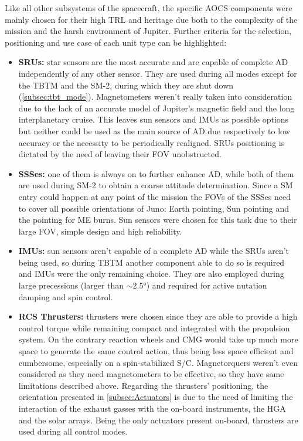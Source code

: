Like all other subsystems of the spacecraft, the specific AOCS components were mainly chosen for their high TRL and heritage due both to the complexity of the mission and the harsh environment of Jupiter. Further criteria for the selection, positioning and use case of each unit type can be highlighted:
\begin{itemize}
    \item \textbf{SRUs:} star sensors are the most accurate and are capable of complete AD independently of any other sensor. They are used during all modes except for the TBTM and the SM-2, during which they are shut down (\autoref{subsec:tbt_mode}). Magnetometers weren't really taken into consideration due to the lack of an accurate model of Jupiter's magnetic field and the long interplanetary cruise. This leaves sun sensors and IMUs as possible options but neither could be used as the main source of AD due respectively to low accuracy or the necessity to be periodically realigned. SRUs positioning is dictated by the need of leaving their FOV unobstructed.
    \item \textbf{SSSes:} one of them is always on to further enhance AD, while both of them are used during SM-2 to obtain a coarse attitude determination. Since a SM entry could happen at any point of the mission the FOVs of the SSSes need to cover all possible orientations of Juno: Earth pointing, Sun pointing and the pointing for ME burns. Sun sensors were chosen for this task due to their large FOV, simple design and high reliability.
    \item \textbf{IMUs:} sun sensors aren't capable of a complete AD while the SRUs aren't being used, so during TBTM another component able to do so is required and IMUs were the only remaining choice. They are also employed during large precessions (larger than $\sim$2.5°) and required for active nutation damping and spin control. \cite{juno_sito}
    \item \textbf{RCS Thrusters:} thrusters were chosen since they are able to provide a high control torque while remaining compact and integrated with the propulsion system. On the contrary reaction wheels and CMG would take up much more space to generate the same control action, thus being less space efficient and cumbersome, especially on a spin-stabilized S/C. Magnetorquers weren't even considered as they need magnetometers to be effective, so they have same limitations described above. Regarding the thrusters' positioning, the orientation presented in \autoref{subsec:Actuators} is due to the need of limiting the interaction of the exhaust gasses with the on-board instruments, the HGA and the solar arrays. Being the only actuators present on-board, thrusters are used during all control modes.
\end{itemize}